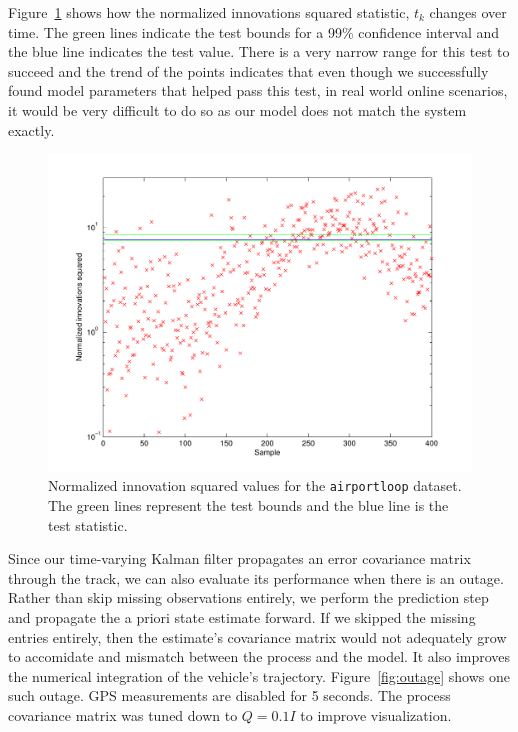 Figure~\ref{fig:nis} shows how the normalized innovations squared statistic, $t_k$ changes over time.  The green lines indicate the test bounds for a 99\% confidence interval and the blue line indicates the test value.  There is a very narrow range for this test to succeed and the trend of the points indicates that even though we successfully found model parameters that helped pass this test, in real world online scenarios, it would be very difficult to do so as our model does not match the system exactly.

\begin{figure}[!b]
\includegraphics[width=\columnwidth]{nis}
\caption{Normalized innovation squared values for the \texttt{airportloop} dataset.  The green lines represent the test bounds and the blue line is the test statistic.}
\label{fig:nis}
\end{figure}

Since our time-varying Kalman filter propagates an error covariance matrix through the track, we can also evaluate its performance when there is an outage.  Rather than skip missing observations entirely, we perform the prediction step and propagate the a priori state estimate forward.  If we skipped the missing entries entirely, then the estimate's covariance matrix would not adequately grow to accomidate and mismatch between the process and the model.  It also improves the numerical integration of the vehicle's trajectory.  Figure~\ref{fig:outage} shows one such outage.  GPS measurements are disabled for 5 seconds.  The process covariance matrix was tuned down to $Q = 0.1I$ to improve visualization.

